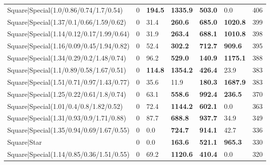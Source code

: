 \begin{tabular}{lrllllr}
 Square|Special(1.0/0.86/0.74/1.7/0.54)                        &             0   & \textbf{194.5} & \textbf{1335.9} & \textbf{503.0}  & 0.0             &          406 \\
 Square|Special(1.37/0.1/0.66/1.59/0.62)                       &             0   & 31.4           & \textbf{260.6}  & \textbf{685.0}  & \textbf{1020.8} &          399 \\
 Square|Special(1.14/0.12/0.17/1.99/0.64)                      &             0   & 31.9           & \textbf{263.4}  & \textbf{688.1}  & \textbf{1010.8} &          398 \\
 Square|Special(1.16/0.09/0.45/1.94/0.82)                      &             0   & 52.4           & \textbf{302.2}  & \textbf{712.7}  & \textbf{909.6}  &          395 \\
 Square|Special(1.34/0.29/0.2/1.48/0.74)                       &             0   & 96.2           & \textbf{529.0}  & \textbf{140.9}  & \textbf{1175.1} &          388 \\
 Square|Special(1.1/0.89/0.58/1.67/0.51)                       &             0   & \textbf{114.8} & \textbf{1354.2} & \textbf{426.4}  & 23.9            &          383 \\
 Square|Special(1.51/0.71/0.97/1.43/0.77)                      &             0   & 35.6           & 11.9            & \textbf{180.3}  & \textbf{1687.9} &          383 \\
 Square|Special(1.25/0.22/0.61/1.8/0.74)                       &             0   & 63.1           & \textbf{558.6}  & \textbf{992.4}  & \textbf{236.5}  &          370 \\
 Square|Special(1.01/0.4/0.8/1.82/0.52)                        &             0   & 72.4           & \textbf{1144.2} & \textbf{602.1}  & 0.0             &          363 \\
 Square|Special(1.31/0.93/0.9/1.71/0.88)                       &             0   & 87.7           & \textbf{688.8}  & \textbf{937.7}  & 34.9            &          349 \\
 Square|Special(1.35/0.94/0.69/1.67/0.55)                      &             0   & 0.0            & \textbf{724.7}  & \textbf{914.1}  & 42.7            &          336 \\
 Square|Star                                                   &             0   & 0.0            & \textbf{163.6}  & \textbf{521.1}  & \textbf{965.3}  &          330 \\
 Square|Special(1.14/0.85/0.36/1.51/0.55)                      &             0   & 69.2           & \textbf{1120.6} & \textbf{410.4}  & 0.0             &          320 \\

\end{tabular}
